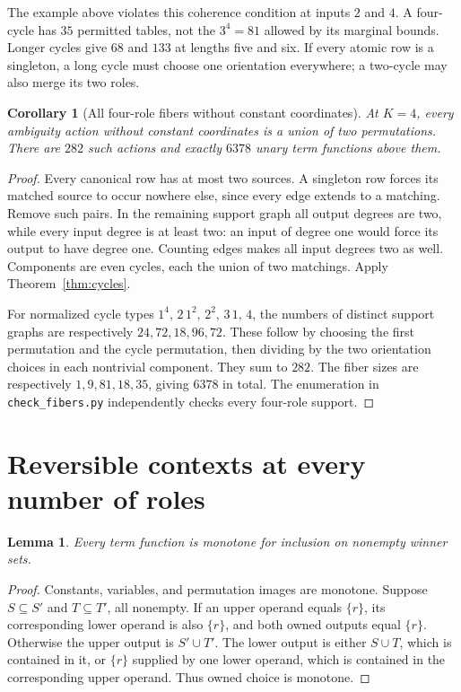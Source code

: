 \documentclass[11pt]{article}
\newtheorem{lemma}[theorem]{Lemma}
\newtheorem{corollary}[theorem]{Corollary}
\begin{document}
The example above violates this coherence condition at inputs $2$ and
$4$. A four-cycle has $35$ permitted tables, not the $3^4=81$ allowed
by its marginal bounds. Longer cycles give $68$ and $133$ at lengths
five and six. If every atomic row is a singleton, a long cycle must
choose one orientation everywhere; a two-cycle may also merge its two
roles.

\begin{corollary}[All four-role fibers without constant coordinates]
At $K=4$, every ambiguity action without constant coordinates is a union
of two permutations. There are $282$ such actions and exactly $6378$
unary term functions above them.
\end{corollary}
\begin{proof}
Every canonical row has at most two sources. A singleton row forces its
matched source to occur nowhere else, since every edge extends to a
matching. Remove such pairs. In the remaining support graph all output
degrees are two, while every input degree is at least two: an input of
degree one would force its output to have degree one. Counting edges
makes all input degrees two as well. Components are even cycles, each
the union of two matchings. Apply Theorem~\ref{thm:cycles}.

For normalized cycle types $1^4,\,2\,1^2,\,2^2,\,3\,1,\,4$, the numbers
of distinct support graphs are respectively $24,72,18,96,72$. These
follow by choosing the first permutation and the cycle permutation, then
dividing by the two orientation choices in each nontrivial component.
They sum to $282$. The fiber sizes are respectively $1,9,81,18,35$,
giving $6378$ in total. The enumeration in \texttt{check\_fibers.py}
independently checks every four-role support.
\end{proof}

\section{Reversible contexts at every number of roles}

\begin{lemma}
Every term function is monotone for inclusion on nonempty winner sets.
\end{lemma}
\begin{proof}
Constants, variables, and permutation images are monotone. Suppose
$S\subseteq S'$ and $T\subseteq T'$, all nonempty. If an upper operand
equals $\{r\}$, its corresponding lower operand is also $\{r\}$, and
both owned outputs equal $\{r\}$. Otherwise the upper output is
$S'\cup T'$. The lower output is either $S\cup T$, which is contained
in it, or $\{r\}$ supplied by one lower operand, which is contained in
the corresponding upper operand. Thus owned choice is monotone.
\end{proof}
\end{document}
